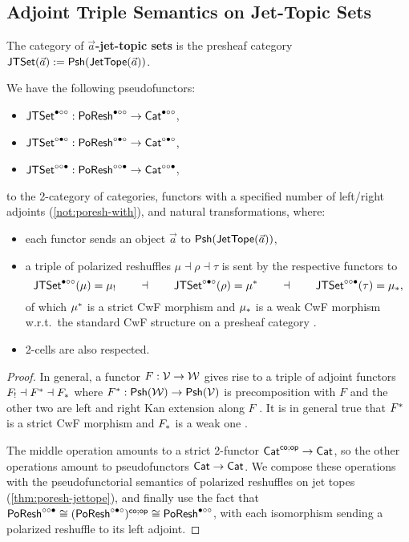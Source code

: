 \documentclass[a4paper]{memoir}
\begin{document}
\subsection{Adjoint Triple Semantics on Jet-Topic Sets} \label{sec:poresh-jtset:triple}
\begin{definition}
	The category of \textbf{$\vec a$-jet-topic sets} is the presheaf category $\mathsf{JTSet}(\vec a) := {\mathsf{Psh}}(\mathsf{JetTope}(\vec a))$.
\end{definition}
\begin{theorem} \label{thm:poresh-jtset:triple}
	We have the following pseudofunctors:
	\begin{itemize}
		\item $\mathsf{JTSet}^{\bullet \circ \circ} : \mathsf{PoResh}^{\bullet \circ \circ} \to {\mathsf{Cat}}^{\bullet \circ \circ}$,
		\item $\mathsf{JTSet}^{\circ \bullet \circ} : \mathsf{PoResh}^{\circ \bullet \circ} \to {\mathsf{Cat}}^{\circ \bullet \circ}$,
		\item $\mathsf{JTSet}^{\circ \circ \bullet} : \mathsf{PoResh}^{\circ \circ \bullet} \to {\mathsf{Cat}}^{\circ \circ \bullet}$,
	\end{itemize}
	to the 2-category of categories, functors with a specified number of left/right adjoints (\cref{not:poresh-with}), and natural transformations, where:
	\begin{itemize}
		\item each functor sends an object $\vec a$ to ${\mathsf{Psh}}(\mathsf{JetTope}(\vec a))$,
		\item a triple of polarized reshuffles $\mu \dashv \rho \dashv \tau$ is sent by the respective functors to
		\[
			\mathsf{JTSet}^{\bullet \circ \circ}(\mu) = {\mu}_!
			\qquad\dashv\qquad
			\mathsf{JTSet}^{\circ \bullet \circ}(\rho) = {\mu}^*
			\qquad\dashv\qquad
			\mathsf{JTSet}^{\circ \circ \bullet}(\tau) = {\mu}_*,
		\]
		of which ${\mu}^*$ is a strict CwF morphism \cite{dybjer-cwf} and ${\mu}_*$ is a weak CwF morphism \cite[def.\ 2.1.1]{reldtt-techreport}\cite[def.\ 3.2.5]{nuyts-phd} w.r.t.\ the standard CwF structure on a presheaf category \cite[ch.\ 4]{Hofmann97}\cite[\S 4.1]{nuyts-phd}.
		\item 2-cells are also respected.
	\end{itemize}
\end{theorem}
\begin{proof}
	In general, a functor $F : {\mathcal{V}} \to {\mathcal{W}}$ gives rise to a triple of adjoint functors ${F}_! \dashv {F}^* \dashv {F}_*$ where ${F}^* : {\mathsf{Psh}}({\mathcal{W}}) \to {\mathsf{Psh}}({\mathcal{V}})$ is precomposition with $F$ and the other two are left and right Kan extension along $F$ \cite{stacks-adjoints,nlab:lifting-functors}\cite[\S 2.3.8]{nuyts-phd}.
	It is in general true that ${F}^*$ is a strict CwF morphism and ${F}_*$ is a weak one \cite[thm.\ 2.2.1 \& prop.\ 2.2.9]{reldtt-techreport}\cite[\S 6.4]{nuyts-phd}.
	
	The middle operation amounts to a strict 2-functor ${\mathsf{Cat}}^{\mathsf{co};\mathsf{op}} \to {\mathsf{Cat}}$, so the other operations amount to pseudofunctors ${\mathsf{Cat}} \to {\mathsf{Cat}}$.
	We compose these operations with the pseudofunctorial semantics of polarized reshuffles on jet topes (\cref{thm:poresh-jettope}), and finally use the fact that $\mathsf{PoResh}^{\circ \circ \bullet} \cong (\mathsf{PoResh}^{\circ \bullet \circ})^{\mathsf{co};\mathsf{op}} \cong \mathsf{PoResh}^{\bullet \circ \circ}$, with each isomorphism sending a polarized reshuffle to its left adjoint.
\end{proof}
\end{document}
